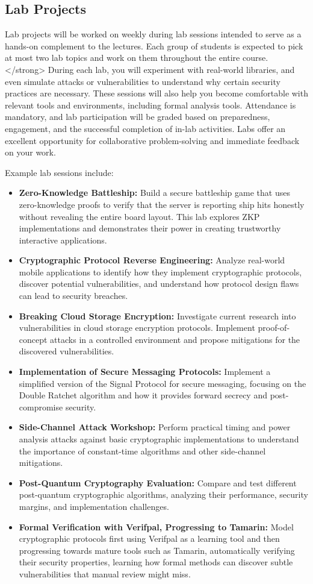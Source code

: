 \documentclass[10pt,a4paper,american]{article}
\begin{document}
\subsection{Lab Projects}
Lab projects will be worked on weekly during lab sessions intended to serve as a hands-on complement to the lectures. Each group of students is expected to pick at most two lab topics and work on them throughout the entire course.</strong> During each lab, you will experiment with real-world libraries, and even simulate attacks or vulnerabilities to understand why certain security practices are necessary. These sessions will also help you become comfortable with relevant tools and environments, including formal analysis tools. Attendance is mandatory, and lab participation will be graded based on preparedness, engagement, and the successful completion of in-lab activities. Labs offer an excellent opportunity for collaborative problem-solving and immediate feedback on your work.

Example lab sessions include:

\begin{itemize}
	\item \textbf{Zero-Knowledge Battleship:} Build a secure battleship game that uses zero-knowledge proofs to verify that the server is reporting ship hits honestly without revealing the entire board layout. This lab explores ZKP implementations and demonstrates their power in creating trustworthy interactive applications.
	\item \textbf{Cryptographic Protocol Reverse Engineering:} Analyze real-world mobile applications to identify how they implement cryptographic protocols, discover potential vulnerabilities, and understand how protocol design flaws can lead to security breaches.
	\item \textbf{Breaking Cloud Storage Encryption:} Investigate current research into vulnerabilities in cloud storage encryption protocols. Implement proof-of-concept attacks in a controlled environment and propose mitigations for the discovered vulnerabilities.
	\item \textbf{Implementation of Secure Messaging Protocols:} Implement a simplified version of the Signal Protocol for secure messaging, focusing on the Double Ratchet algorithm and how it provides forward secrecy and post-compromise security.
	\item \textbf{Side-Channel Attack Workshop:} Perform practical timing and power analysis attacks against basic cryptographic implementations to understand the importance of constant-time algorithms and other side-channel mitigations.
	\item \textbf{Post-Quantum Cryptography Evaluation:} Compare and test different post-quantum cryptographic algorithms, analyzing their performance, security margins, and implementation challenges.
	\item \textbf{Formal Verification with Verifpal, Progressing to Tamarin:} Model cryptographic protocols first using Verifpal as a learning tool and then progressing towards mature tools such as Tamarin, automatically verifying their security properties, learning how formal methods can discover subtle vulnerabilities that manual review might miss.
\end{itemize}
\end{document}
